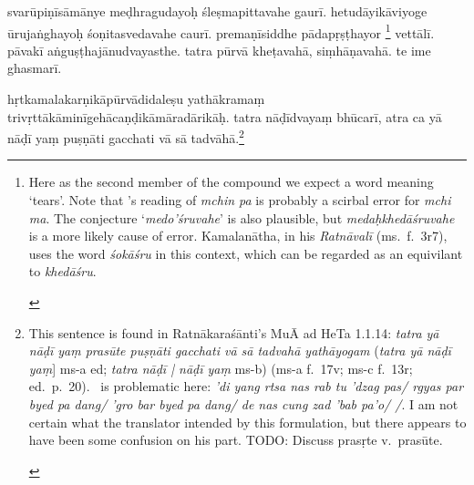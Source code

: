 \documentclass[naipra.tex]{subfiles}
\begin{document}
\begin{sanskrit}
\pstart
svarūpiṇīsāmānye meḍhragudayoḥ śleṣmapittavahe gaurī. 
hetudāyikāviyoge ūrujaṅghayoḥ śoṇitasvedavahe caurī. 
premaṇīsiddhe pādapṛṣṭhayor \footnote{\begin{english}
	Here as the second member of the compound we expect a word meaning `tears'.
	Note that \TIB 's reading of \emph{mchin pa} is probably a scirbal error for \emph{mchi ma}.
	The conjecture `\emph{medo'śruvahe}' is also plausible, but \emph{medaḥkhedāśruvahe} is a more likely cause of error. 
	Kamalanātha, in his \emph{Ratnāvalī} (ms.\ f.\ 3r7), uses the word \emph{śokāśru} in this context, which can be regarded as an equivilant to \emph{khedāśru}.
\end{english}} vettālī. 
pāvakī aṅguṣṭhajānudvayasthe.
tatra pūrvā kheṭavahā,  siṃhāṇavahā.
te ime ghasmarī. 
\pend


\pstart
hṛtkamalakarṇikāpūrvādidaleṣu yathākramaṃ trivṛttā\dsh kāminī\dsh gehā\dsh caṇḍikā\dsh māradārikāḥ. 
tatra  nāḍīdvayaṃ bhūcarī, 
atra ca yā nāḍī yaṃ  puṣṇāti gacchati vā sā tadvāhā.\footnote{\begin{english}
	This sentence is found in Ratnākaraśānti's MuĀ ad HeTa 1.1.14: \emph{tatra yā nāḍī yaṃ prasūte puṣṇāti gacchati vā sā tadvahā yathāyogam} (\emph{tatra yā nāḍī yaṃ}] ms-a ed; \emph{tatra nāḍī | nāḍī yaṃ} ms-b) (ms-a f.\ 17v; ms-c f.\ 13r; ed.\ p.\ 20).
	\TIB\ is problematic here: \emph{'di yang rtsa nas rab tu 'dzag pas/ rgyas par byed pa dang/ 'gro bar byed pa dang/ de nas cung zad 'bab pa'o/ /}.
	I am not certain what the translator intended by this formulation, but there appears to have been some confusion on his part.
	TODO: Discuss prasṛte v.\ prasūte.
\end{english}} 
\pend


\end{sanskrit}
\end{document}
